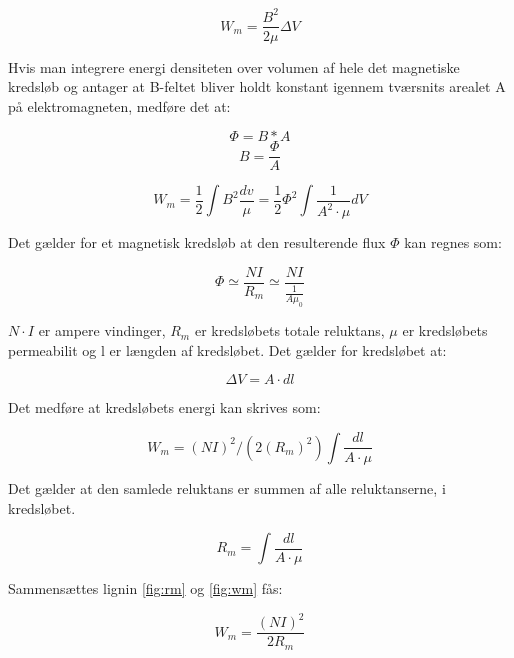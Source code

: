 \begin{equation}
W_m =\frac{B^2}{2 \mu} \Delta V
\end{equation}

Hvis man integrere energi densiteten over volumen af hele det magnetiske kredsløb og antager at B-feltet bliver holdt konstant igennem tværsnits arealet A på elektromagneten, medføre det at:

\begin{equation}
\Phi=B*A
\end{equation}
\begin{equation}
B=\frac{\Phi}{A}
\end{equation}

\begin{equation}
W_m = \frac{1}{2} \int B^2 \frac{dv}{\mu}  = \frac{1}{2} \Phi^2 \int \frac{1}{A^2 \cdot \mu} dV
\end{equation}

Det gælder for et magnetisk kredsløb at den resulterende flux $\Phi$ kan regnes som:

\begin{equation}
\Phi \simeq \frac{NI}{R_m} \simeq  \frac{NI}{\frac{1}{A\mu_0}}
\end{equation}

$N \cdot I$ er ampere vindinger, $R_m$ er kredsløbets totale reluktans, $ \mu $ er kredsløbets permeabilit og l er længden af kredsløbet. Det gælder for kredsløbet at:

\begin{equation}
\Delta V =A \cdot dl
\end{equation}

Det medføre at kredsløbets energi kan skrives som:

\begin{equation}
W_m = (NI)^2/(2(R_m)^2) \int \frac{dl}{A \cdot \mu}
\label{fig:wm}
\end{equation}

Det gælder at den samlede reluktans er summen af alle reluktanserne, i kredsløbet.

\begin{equation}
R_m = \int \frac{dl}{A \cdot \mu}
\label{fig:rm}
\end{equation}

Sammensættes lignin \ref{fig:rm} og \ref{fig:wm} fås:

\begin{equation}
W_m = \frac{(NI)^2}{2R_m}
\label{wmdone}
\end{equation}

